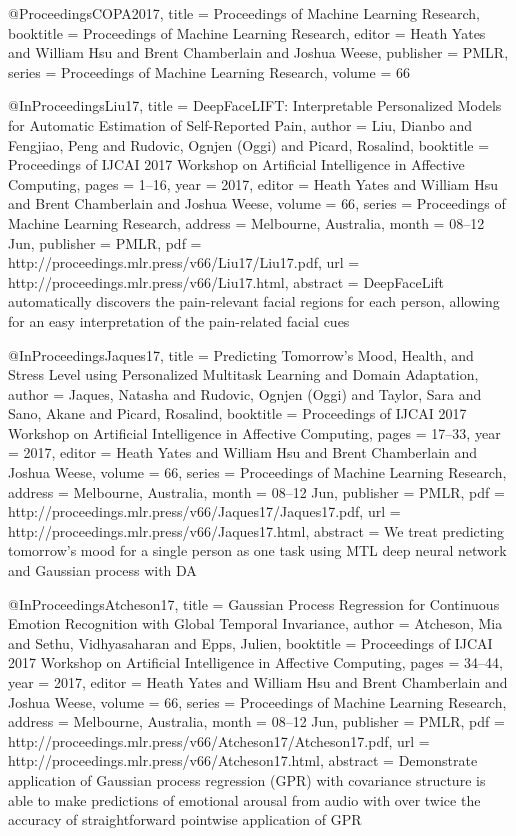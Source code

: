 
@Proceedings{COPA2017,
  title =     {Proceedings of Machine Learning Research},
  booktitle = {Proceedings of Machine Learning Research},
  editor =    {Heath Yates and William Hsu and Brent Chamberlain and Joshua Weese},
  publisher = {PMLR},
  series =    {Proceedings of Machine Learning Research},
  volume =    66
}


@InProceedings{Liu17,
  title = {DeepFaceLIFT: Interpretable Personalized Models for Automatic Estimation of Self-Reported Pain},
  author = {Liu, Dianbo and Fengjiao, Peng and Rudovic, Ognjen (Oggi) and Picard, Rosalind},
  booktitle = {Proceedings of IJCAI 2017 Workshop on Artificial Intelligence in Affective Computing},
  pages = 	 {1--16},
  year = 	 {2017},
  editor =    {Heath Yates and William Hsu and Brent Chamberlain and Joshua Weese},
  volume = 	 {66},
  series = 	 {Proceedings of Machine Learning Research},
  address =  {Melbourne, Australia},
  month = 	 {08--12 Jun},
  publisher = {PMLR},
  pdf = 	 {http://proceedings.mlr.press/v66/Liu17/Liu17.pdf},
  url = 	 {http://proceedings.mlr.press/v66/Liu17.html},
  abstract = {DeepFaceLift automatically discovers the pain-relevant facial regions for each person, allowing for an easy interpretation of the pain-related facial cues}
}


@InProceedings{Jaques17,
  title = {Predicting Tomorrow's Mood, Health, and Stress Level using Personalized Multitask Learning and Domain Adaptation},
  author = {Jaques, Natasha and Rudovic, Ognjen (Oggi) and Taylor, Sara and Sano, Akane and Picard, Rosalind},
  booktitle = {Proceedings of IJCAI 2017 Workshop on Artificial Intelligence in Affective Computing},
  pages = 	 {17--33},
  year = 	 {2017},
  editor =    {Heath Yates and William Hsu and Brent Chamberlain and Joshua Weese},
  volume = 	 {66},
  series = 	 {Proceedings of Machine Learning Research},
  address =  {Melbourne, Australia},
  month = 	 {08--12 Jun},
  publisher = {PMLR},
  pdf = 	 {http://proceedings.mlr.press/v66/Jaques17/Jaques17.pdf},
  url = 	 {http://proceedings.mlr.press/v66/Jaques17.html},
  abstract = {We treat predicting tomorrow's mood for a single person as one task using MTL deep neural network and Gaussian process with DA}
}

@InProceedings{Atcheson17,
  title = {Gaussian Process Regression for Continuous Emotion Recognition with Global Temporal Invariance},
  author = {Atcheson, Mia and Sethu, Vidhyasaharan and Epps, Julien},
  booktitle = {Proceedings of IJCAI 2017 Workshop on Artificial Intelligence in Affective Computing},
  pages = 	 {34--44},
  year = 	 {2017},
  editor =    {Heath Yates and William Hsu and Brent Chamberlain and Joshua Weese},
  volume = 	 {66},
  series = 	 {Proceedings of Machine Learning Research},
  address =  {Melbourne, Australia},
  month = 	 {08--12 Jun},
  publisher = {PMLR},
  pdf = 	 {http://proceedings.mlr.press/v66/Atcheson17/Atcheson17.pdf},
  url = 	 {http://proceedings.mlr.press/v66/Atcheson17.html},
  abstract = {Demonstrate application of Gaussian process regression (GPR) with covariance structure is able to make predictions of emotional arousal from audio with over twice the accuracy of straightforward pointwise application of GPR}
}

